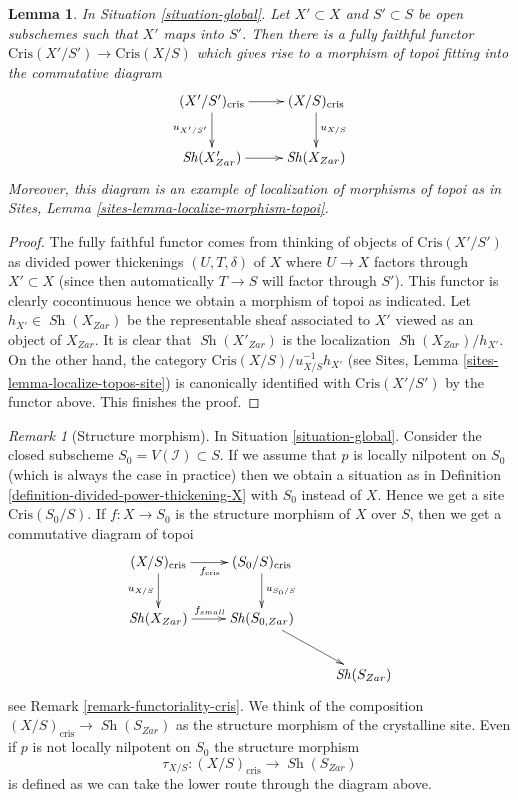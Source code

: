 \documentclass{stacks-project}
\theoremstyle{plain}
\newtheorem{lemma}[subsection]{Lemma}
\theoremstyle{definition}
\theoremstyle{remark}
\newtheorem{remark}[subsection]{Remark}
\numberwithin{equation}{subsection}
\def\Sh{\mathop{\mathit{Sh}}\nolimits}
\begin{document}
\begin{lemma}
\label{lemma-localize}
In Situation \ref{situation-global}.
Let $X' \subset X$ and $S' \subset S$ be open subschemes such that
$X'$ maps into $S'$. Then there is a fully faithful functor
$\text{Cris}(X'/S') \to \text{Cris}(X/S)$
which gives rise to a morphism of topoi fitting into the commutative
diagram
$$
\xymatrix{
(X'/S')_{\text{cris}} \ar[r] \ar[d]_{u_{X'/S'}} &
(X/S)_{\text{cris}} \ar[d]^{u_{X/S}} \\
\Sh(X'_{Zar}) \ar[r] & \Sh(X_{Zar})
}
$$
Moreover, this diagram is an example of localization of morphisms of
topoi as in Sites, Lemma \ref{sites-lemma-localize-morphism-topoi}.
\end{lemma}

\begin{proof}
The fully faithful functor comes from thinking of
objects of $\text{Cris}(X'/S')$ as divided power
thickenings $(U, T, \delta)$ of $X$ where $U \to X$
factors through $X' \subset X$ (since then automatically $T \to S$
will factor through $S'$). This functor is clearly cocontinuous
hence we obtain a morphism of topoi as indicated.
Let $h_{X'} \in \Sh(X_{Zar})$ be the representable sheaf associated
to $X'$ viewed as an object of $X_{Zar}$. It is clear that
$\Sh(X'_{Zar})$ is the localization $\Sh(X_{Zar})/h_{X'}$.
On the other hand, the category $\text{Cris}(X/S)/u_{X/S}^{-1}h_{X'}$
(see Sites, Lemma \ref{sites-lemma-localize-topos-site})
is canonically identified with $\text{Cris}(X'/S')$ by the functor above.
This finishes the proof.
\end{proof}

\begin{remark}[Structure morphism]
\label{remark-structure-morphism}
In Situation \ref{situation-global}.
Consider the closed subscheme $S_0 = V(\mathcal{I}) \subset S$.
If we assume that $p$ is locally nilpotent on $S_0$ (which is always
the case in practice) then we obtain a situation as in
Definition \ref{definition-divided-power-thickening-X} with $S_0$ instead
of $X$. Hence we get a site $\text{Cris}(S_0/S)$. If $f : X \to S_0$
is the structure morphism of $X$ over $S$, then we get a
commutative diagram of topoi
$$
\xymatrix{
(X/S)_{\text{cris}}
\ar[r]_{f_{\text{cris}}} \ar[d]_{u_{X/S}} &
(S_0/S)_{\text{cris}} \ar[d]^{u_{S_0/S}} \\
\Sh(X_{Zar}) \ar[r]^{f_{small}} & \Sh(S_{0, Zar}) \ar[rd] \\
& & \Sh(S_{Zar})
}
$$
see Remark \ref{remark-functoriality-cris}. We think of the composition
$(X/S)_{\text{cris}} \to \Sh(S_{Zar})$ as the structure morphism of the
crystalline site. Even if $p$ is not locally nilpotent on $S_0$
the structure morphism
$$
\tau_{X/S} : (X/S)_{\text{cris}} \longrightarrow \Sh(S_{Zar})
$$
is defined as we can take the lower route through the diagram above.
\end{remark}
\end{document}
